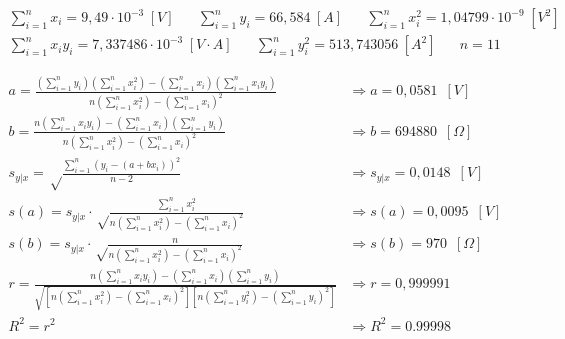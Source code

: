 \documentclass[11pt]{report}
\begin{document}
\begin{refsection}
\begin{equation}
\begin{split}
    \sum^n_{i=1} x_i = 9,49 \cdot 10^{-3} \hspace{3pt}[V] \hspace{20pt}
    \sum^n_{i=1} y_i = 66,584 \hspace{3pt}[A]\hspace{20pt}
    \sum^n_{i=1} x_i^2 = 1,04799 \cdot 10^{-9}\hspace{3pt} [V^2] \hspace{20pt} \\
    \sum^n_{i=1} x_i y_i = 7,337486 \cdot 10^{-3} \hspace{3pt} [V\cdot A] \hspace{20pt}
    \sum^n_{i=1} y_i^2 = 513,743056 \hspace{3pt}[A^2] \hspace{20pt}
    n=11\hspace{20pt}
    \label{eq:sumx2}
\end{split}
\end{equation}
\bigskip
\begin{center}
\begin{align}
    a = \frac{(\sum^n_{i=1} y_i)(\sum^n_{i=1} x^2_i )-(\sum^n_{i=1} x_i)(\sum^n_{i=1} x_i y_i)}{n(\sum^n_{i=1} x_i^2)-(\sum^n_{i=1} x_i)^2} &\Rightarrow a= 0,0581\hspace{6pt} [V] \label{eq:a2}\\
    b = \frac{n(\sum^n_{i=1} x_i y_i)-(\sum^n_{i=1} x_i)(\sum^n_{i=1} y_i)}{n(\sum^n_{i=1} x_i^2)-(\sum^n_{i=1} x_i)^2} &\Rightarrow b= 694880 \hspace{6pt}[\Omega] \label{eq:b2}\\
    s_{y|x} =\sqrt\frac{\sum^n_{i=1}(y_i-(a+b x_i))^2}{n-2} &\Rightarrow s_{y|x}= 0,0148 \hspace{6pt}[V] \label{eq:s2}\\
    s(a) =s_{y|x} \cdot \sqrt\frac{\sum^n_{i=1}x_i^2}{n(\sum^n_{i=1} x_i^2)-(\sum^n_{i=1} x_i)^2} &\Rightarrow s(a)= 0,0095 \hspace{6pt}[V] \label{eq:s2a}\\
    s(b) =s_{y|x} \cdot \sqrt\frac{n}{n(\sum^n_{i=1} x_i^2)-(\sum^n_{i=1} x_i)^2} &\Rightarrow s(b)= 970 \hspace{6pt}[\Omega] \label{eq:s2b}\\
    r = \frac{n(\sum^n_{i=1} x_i y_i)-(\sum^n_{i=1} x_i)(\sum^n_{i=1} y_i)}{\sqrt{[n(\sum^n_{i=1} x_i^2)-(\sum^n_{i=1} x_i)^2][n(\sum^n_{i=1} y_i^2)-(\sum^n_{i=1} y_i)^2]}}&\Rightarrow r= 0,999991 \label{eq:R2}\\
    R^2 =r^2&\Rightarrow R^2=0.99998 \label{eq:R22}
\end{align}
\end{center}


\end{refsection}
\end{document}
